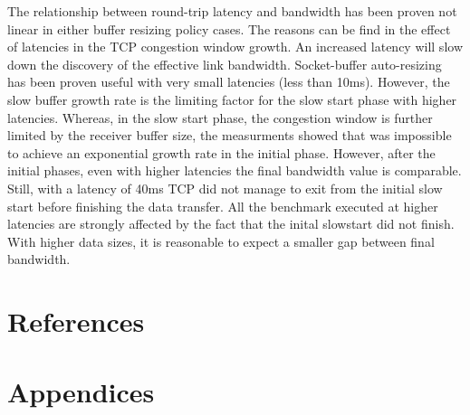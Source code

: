\documentclass[a4paper,10pt]{article}
\begin{document}
The relationship between round-trip latency and bandwidth has been proven not linear in either buffer resizing policy cases. The reasons can be find in the effect of latencies in the TCP congestion window growth. An increased latency will slow down the discovery of the effective link bandwidth. 
Socket-buffer auto-resizing has been proven useful with very small latencies (less than 10ms). However, the slow buffer growth rate is the limiting factor for the slow start phase with higher latencies. 
Whereas, in the slow start phase, the congestion window is further limited by the receiver buffer size, the measurments showed that was impossible to achieve an exponential growth rate in the initial phase. However, after the initial phases, even with higher latencies the final bandwidth value is comparable. 
Still, with a latency of 40ms TCP did not manage to exit from the initial slow start before finishing the data transfer. 
All the benchmark executed at higher latencies are strongly affected by the fact that the inital slowstart did not finish. With higher data sizes, it is reasonable to expect a smaller gap between final bandwidth. 

\newpage

\section{References}

\printbibliography

\section{Appendices}
\end{document}
